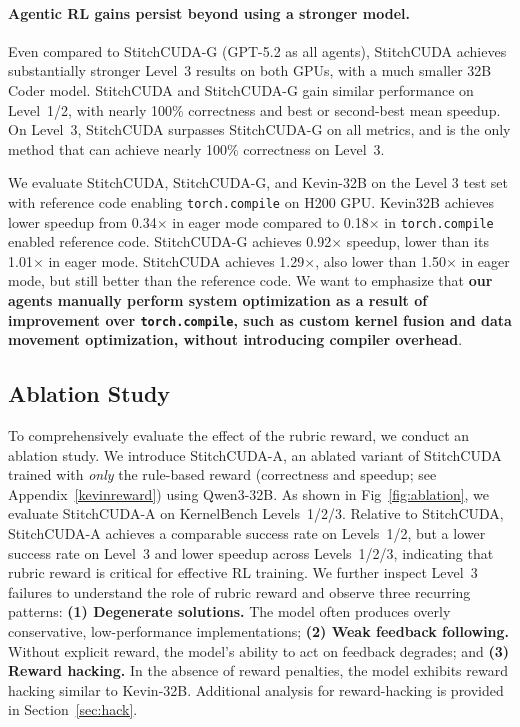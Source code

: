 \paragraph{Agentic RL gains persist beyond using a stronger model.}
Even compared to StitchCUDA-G (GPT-5.2 as all agents), StitchCUDA achieves substantially stronger Level~3 results on both GPUs, with a much smaller 32B Coder model. StitchCUDA and StitchCUDA-G gain similar performance on Level~1/2, with nearly 100\% correctness and best or second-best mean speedup. On Level~3, StitchCUDA surpasses StitchCUDA-G on all metrics, and is the only method that can achieve nearly 100\% correctness on Level~3. 



We evaluate StitchCUDA, StitchCUDA-G, and Kevin-32B on the Level 3 test set with reference code enabling \texttt{torch.compile} on H200 GPU. Kevin32B achieves lower speedup from 0.34$\times$ in eager mode compared to 0.18$\times$ in \texttt{torch.compile} enabled reference code. StitchCUDA-G achieves 0.92$\times$ speedup, lower than its 1.01$\times$ in eager mode. StitchCUDA achieves 1.29$\times$, also lower than 1.50$\times$ in eager mode, but still better than the reference code. 
We want to emphasize that \textbf{our agents manually perform system optimization as a result of improvement over \texttt{torch.compile}, such as custom kernel fusion and data movement optimization, without introducing compiler overhead}.



\label{sec:main_result}
\subsection{Ablation Study}
To comprehensively evaluate the effect of the rubric reward, we conduct an ablation study. 
We introduce StitchCUDA-A, an ablated variant of StitchCUDA
trained with \emph{only} the rule-based reward (correctness and speedup; see
Appendix~\ref{kevinreward}) using Qwen3-32B. As shown in Fig~\ref{fig:ablation}, we evaluate StitchCUDA-A
on KernelBench Levels~1/2/3. Relative to StitchCUDA,
StitchCUDA-A achieves a comparable success rate on Levels~1/2, but a
lower success rate on Level~3 and lower speedup across Levels~1/2/3, indicating
that rubric reward is critical for effective RL training. We further inspect
Level~3 failures to understand the role of rubric reward and observe three
recurring patterns: \textbf{(1) Degenerate solutions.} The model often
produces overly conservative, low-performance implementations; \textbf{(2) Weak
feedback following.} Without explicit reward, the model’s ability to act on feedback degrades; and \textbf{(3) Reward hacking.} In the absence of reward penalties, the model exhibits reward hacking similar to Kevin-32B. Additional analysis for reward-hacking is provided in Section~\ref{sec:hack}.

